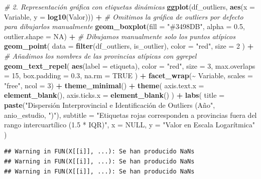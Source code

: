 \documentclass[
]{article}
\newenvironment{Shaded}{\begin{snugshade}}{\end{snugshade}}
\newcommand{\AttributeTok}[1]{\textcolor[rgb]{0.13,0.29,0.53}{#1}}
\newcommand{\CommentTok}[1]{\textcolor[rgb]{0.56,0.35,0.01}{\textit{#1}}}
\newcommand{\ConstantTok}[1]{\textcolor[rgb]{0.56,0.35,0.01}{#1}}
\newcommand{\DecValTok}[1]{\textcolor[rgb]{0.00,0.00,0.81}{#1}}
\newcommand{\FloatTok}[1]{\textcolor[rgb]{0.00,0.00,0.81}{#1}}
\newcommand{\FunctionTok}[1]{\textcolor[rgb]{0.13,0.29,0.53}{\textbf{#1}}}
\newcommand{\NormalTok}[1]{#1}
\newcommand{\SpecialCharTok}[1]{\textcolor[rgb]{0.81,0.36,0.00}{\textbf{#1}}}
\newcommand{\StringTok}[1]{\textcolor[rgb]{0.31,0.60,0.02}{#1}}
\begin{document}
\begin{Shaded}
\begin{Highlighting}[]
\CommentTok{\# 2. Representación gráfica con etiquetas dinámicas}
\FunctionTok{ggplot}\NormalTok{(df\_outliers, }\FunctionTok{aes}\NormalTok{(}\AttributeTok{x =}\NormalTok{ Variable, }\AttributeTok{y =} \FunctionTok{log10}\NormalTok{(Valor))) }\SpecialCharTok{+}
  \CommentTok{\# Omitimos la gráfica de outliers por defecto para dibujarlos manualmente}
  \FunctionTok{geom\_boxplot}\NormalTok{(}\AttributeTok{fill =} \StringTok{"\#3498DB"}\NormalTok{, }\AttributeTok{alpha =} \FloatTok{0.5}\NormalTok{, }\AttributeTok{outlier.shape =} \ConstantTok{NA}\NormalTok{) }\SpecialCharTok{+}
  \CommentTok{\# Dibujamos manualmente solo los puntos atípicos}
  \FunctionTok{geom\_point}\NormalTok{(}
    \AttributeTok{data =} \FunctionTok{filter}\NormalTok{(df\_outliers, is\_outlier),}
    \AttributeTok{color =} \StringTok{"red"}\NormalTok{,}
    \AttributeTok{size =} \DecValTok{2}
\NormalTok{  ) }\SpecialCharTok{+}
  \CommentTok{\# Añadimos los nombres de las provincias atípicas con ggrepel}
  \FunctionTok{geom\_text\_repel}\NormalTok{(}
    \FunctionTok{aes}\NormalTok{(}\AttributeTok{label =}\NormalTok{ etiqueta),}
    \AttributeTok{color =} \StringTok{"red"}\NormalTok{,}
    \AttributeTok{size =} \DecValTok{3}\NormalTok{,}
    \AttributeTok{max.overlaps =} \DecValTok{15}\NormalTok{,}
    \AttributeTok{box.padding =} \FloatTok{0.3}\NormalTok{,}
    \AttributeTok{na.rm =} \ConstantTok{TRUE}
\NormalTok{  ) }\SpecialCharTok{+}
  \FunctionTok{facet\_wrap}\NormalTok{(}\SpecialCharTok{\textasciitilde{}}\NormalTok{ Variable, }\AttributeTok{scales =} \StringTok{"free"}\NormalTok{, }\AttributeTok{ncol =} \DecValTok{3}\NormalTok{) }\SpecialCharTok{+}
  \FunctionTok{theme\_minimal}\NormalTok{() }\SpecialCharTok{+}
  \FunctionTok{theme}\NormalTok{(}
    \AttributeTok{axis.text.x =} \FunctionTok{element\_blank}\NormalTok{(),}
    \AttributeTok{axis.ticks.x =} \FunctionTok{element\_blank}\NormalTok{()}
\NormalTok{  ) }\SpecialCharTok{+}
  \FunctionTok{labs}\NormalTok{(}
    \AttributeTok{title =} \FunctionTok{paste}\NormalTok{(}\StringTok{"Dispersión Interprovincial e Identificación de Outliers (Año"}\NormalTok{, anio\_estudio, }\StringTok{")"}\NormalTok{),}
    \AttributeTok{subtitle =} \StringTok{"Etiquetas rojas corresponden a provincias fuera del rango intercuartílico (1.5 * IQR)"}\NormalTok{,}
    \AttributeTok{x =} \ConstantTok{NULL}\NormalTok{,}
    \AttributeTok{y =} \StringTok{"Valor en Escala Logarítmica"}
\NormalTok{  )}
\end{Highlighting}
\end{Shaded}

\begin{verbatim}
## Warning in FUN(X[[i]], ...): Se han producido NaNs
## Warning in FUN(X[[i]], ...): Se han producido NaNs
## Warning in FUN(X[[i]], ...): Se han producido NaNs
\end{verbatim}
\end{document}
